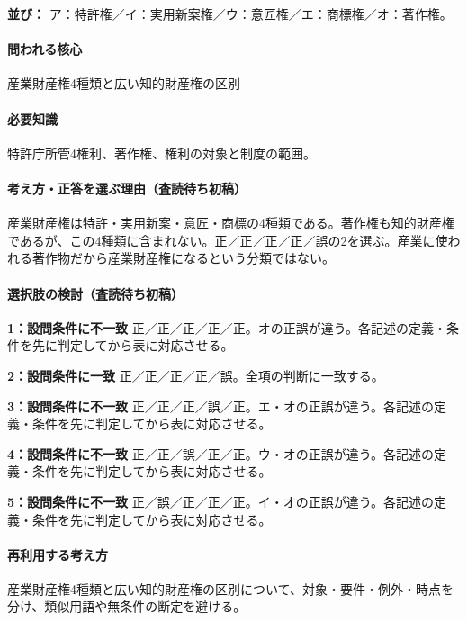 \noindent\textbf{並び：} ア：特許権／イ：実用新案権／ウ：意匠権／エ：商標権／オ：著作権。\par

\paragraph{問われる核心} 産業財産権4種類と広い知的財産権の区別

\paragraph{必要知識} 特許庁所管4権利、著作権、権利の対象と制度の範囲。

\paragraph{考え方・正答を選ぶ理由（査読待ち初稿）} 産業財産権は特許・実用新案・意匠・商標の4種類である。著作権も知的財産権であるが、この4種類に含まれない。正／正／正／正／誤の2を選ぶ。産業に使われる著作物だから産業財産権になるという分類ではない。

\paragraph{選択肢の検討（査読待ち初稿）}\mbox{}\par

\noindent\textbf{1：設問条件に不一致} 正／正／正／正／正。オの正誤が違う。各記述の定義・条件を先に判定してから表に対応させる。\par

\noindent\textbf{2：設問条件に一致} 正／正／正／正／誤。全項の判断に一致する。\par

\noindent\textbf{3：設問条件に不一致} 正／正／正／誤／正。エ・オの正誤が違う。各記述の定義・条件を先に判定してから表に対応させる。\par

\noindent\textbf{4：設問条件に不一致} 正／正／誤／正／正。ウ・オの正誤が違う。各記述の定義・条件を先に判定してから表に対応させる。\par

\noindent\textbf{5：設問条件に不一致} 正／誤／正／正／正。イ・オの正誤が違う。各記述の定義・条件を先に判定してから表に対応させる。\par

\paragraph{再利用する考え方} 産業財産権4種類と広い知的財産権の区別について、対象・要件・例外・時点を分け、類似用語や無条件の断定を避ける。

